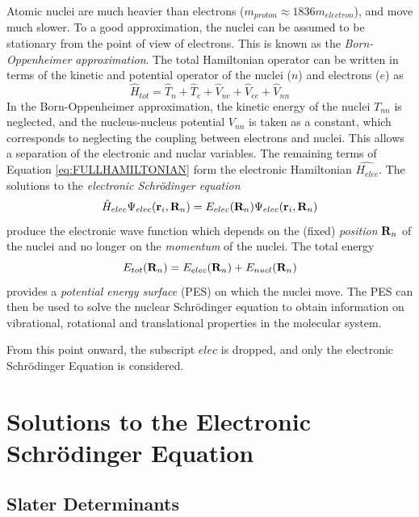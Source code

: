 Atomic nuclei are much heavier than electrons ($m_{proton} \approx 1836 m_{electron}$), and move much slower. To a good approximation, the nuclei can be assumed to be stationary from the point of view of electrons. This is known as the \emph{Born-Oppenheimer approximation}. The total Hamiltonian operator can be written in terms of the kinetic and potential operator of the nuclei ($n$) and electrons ($e$) as
\begin{equation}
\hat{H}_{tot} = \hat{T}_n + \hat{T}_e + \hat{V}_{ne} + \hat{V}_{ee} + \hat{V}_{nn}
\label{eq:FULLHAMILTONIAN}
\end{equation}
\noindent In the Born-Oppenheimer approximation, the kinetic energy of the nuclei $T_{nn}$ is neglected, and the nucleus-nucleus potential $V_{nn}$ is taken as a constant, which corresponds to neglecting the coupling between electrons and nuclei. This allows a separation of the electronic and nuclar variables. The remaining terms of Equation \ref{eq:FULLHAMILTONIAN} form the electronic Hamiltonian $\hat{H_{elec}}$. The solutions to the \emph{electronic Schrödinger equation}
\begin{equation}
\hat{H}_{elec} \Psi_{elec}(\mathbf{r}_i, \mathbf{R}_n ) = E_{elec}(\mathbf{R}_n) \Psi_{elec}(\mathbf{r}_i, \mathbf{R}_n )
\end{equation}
\noindent produce the electronic wave function which depends on the (fixed) \emph{position} $\mathbf{R}_n$ of the nuclei and no longer on the \emph{momentum} of the nuclei. The total energy
\begin{equation}
E_{tot}(\mathbf{R}_n) = E_{elec}(\mathbf{R}_n) + E_{nucl}(\mathbf{R}_n)
\end{equation} 
\noindent provides a \emph{potential energy surface} (PES) on which the nuclei move. The PES can then be used to solve the nuclear Schrödinger equation to obtain information on vibrational, rotational and translational properties in the molecular system.

From this point onward, the subscript $elec$ is dropped, and only the electronic Schrödinger Equation is considered.

\section{Solutions to the Electronic Schrödinger Equation}

\subsection{Slater Determinants}


